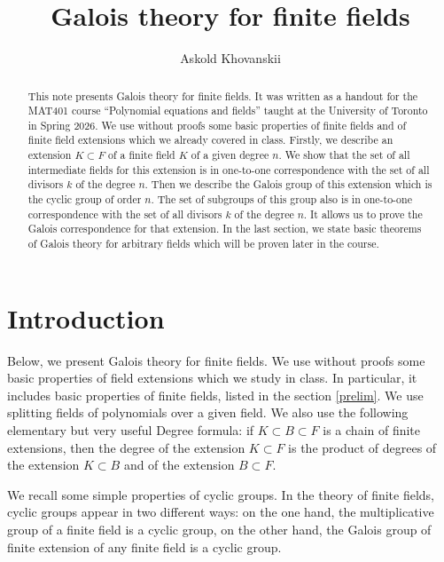 \documentclass[11pt]{article}
\theoremstyle{plain}
\theoremstyle{definition}
\begin{document}

\title{Galois theory for finite fields}

\author{Askold Khovanskii}%

\maketitle

\begin{abstract}
This note presents  Galois  theory for finite fields. It was written as a handout for the  MAT401 course ``Polynomial equations and fields'' taught at the University of Toronto  in Spring 2026. We use without proofs some basic properties of finite fields and of finite field extensions which we already covered in class. Firstly, we  describe an extension  $K\subset F$ of a finite field $K$ of a given degree $n$. We show that the set of all intermediate fields for this extension is in one-to-one correspondence with the set of all divisors $k$ of the degree $n$. Then we  describe the Galois group of this extension which is the cyclic group of order $n$. The set of subgroups of this group also is in one-to-one correspondence  with the set of all divisors $k$ of the degree $n$. It allows us to prove the Galois correspondence for that extension. In the last section, we state basic theorems of Galois theory for arbitrary fields which will be proven later in the course.
\end{abstract}

\section{Introduction}\label{intro}

Below, we present  Galois theory for finite fields. We use without proofs some
 basic  properties of  field extensions which we study in class. In particular, it includes  basic properties of finite fields, listed in the  section \ref{prelim}. We use
 splitting fields of polynomials over a given field.  We also use the following elementary but very useful  Degree formula: if $K\subset B\subset F$ is a chain of finite extensions, then the degree of the extension $K\subset F$ is the product of degrees of the extension $K\subset B$ and of the extension $B\subset F$.

We  recall   some simple properties of cyclic groups. In the theory  of finite fields, cyclic groups appear in two  different ways: on the one hand, the multiplicative group of a finite field is a cyclic group, on the other hand, the Galois group of  finite extension of any finite field  is a cyclic group.
\end{document}
